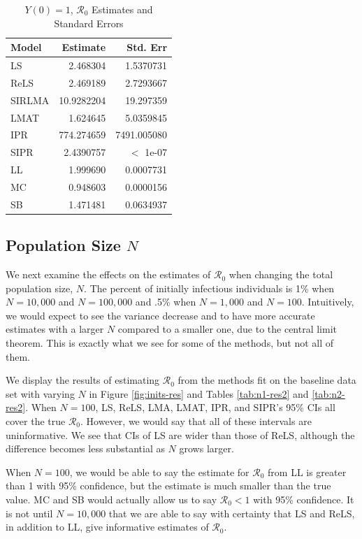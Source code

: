 \documentclass[12pt]{article}
\newcommand{\rr}{\ensuremath{\mathcal{R}_0}}
\begin{document}
\begin{table}[H]
	
	\centering
	\begin{tabular}[t]{l|r|r}
		\hline
		Model & Estimate & Std. Err\\
		\hline
		LS & 2.468304 & 1.5370731\\
		\hline
		ReLS & 2.469189 & 2.7293667\\
		\hline
		SIRLMA & 10.9282204 & 19.297359 \\
		\hline
		LMAT & 1.624645 & 5.0359845\\
		\hline
		IPR & 774.274659 & 7491.005080 \\
		\hline
		SIPR & 2.4390757 & $<$ 1e-07 \\
		\hline
		LL & 1.999690 & 0.0007731\\
		\hline
		MC & 0.948603 & 0.0000156\\
		\hline
		SB & 1.471481 & 0.0634937\\
		\hline
	\end{tabular}
        \caption{$Y(0) = 1$, $\rr$ Estimates and Standard Errors}\label{tab:inits-res2}
\end{table}

\subsection{Population Size $N$}\label{sec:res-n}
We next examine the effects on the estimates of $\rr$ when changing the total population size, $N$.  The percent of initially infectious individuals is 1\% when $N=10,000$ and $N=100,000$ and .5\% when $N=1,000$ and $N=100$. Intuitively, we would expect to see the variance decrease and to have more accurate estimates with a larger $N$ compared to a smaller one, due to the central limit theorem.  This is exactly what we see for some of the methods, but not all of them.

We display the results of estimating $\rr$ from the methods fit on the baseline data set with varying $N$ in Figure \ref{fig:inits-res} and Tables \ref{tab:n1-res2} and \ref{tab:n2-res2}.  When $N=100$, LS, ReLS, LMA, LMAT, IPR, and SIPR's 95\% CIs all cover the true $\rr$.  However, we would say that all of these intervals are uninformative.  We see that CIs of LS are wider than those of ReLS, although the difference becomes less substantial as $N$ grows larger.

When $N=100$, we would be able to say the estimate for $\rr$ from LL is greater than 1 with 95\% confidence, but the estimate is much smaller than the true value.  MC and SB would actually allow us to say $\rr < 1$ with 95\% confidence.  It is not until $N=10,000$ that we are able to say with certainty that LS and ReLS, in addition to LL, give informative estimates of $\rr$.
\end{document}
